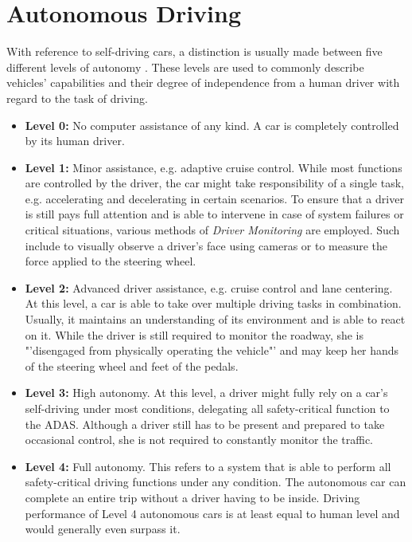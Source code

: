 \section{Autonomous Driving}
\label{sec:background:autonomous_driving}
With reference to self-driving cars, a distinction is usually made between five different levels of autonomy \cite{Klein}. These levels are used to commonly describe vehicles' capabilities and their degree of independence from a human driver with regard to the task of driving. 

\begin{itemize}
	\item \textbf{Level 0:} No computer assistance of any kind. A car is completely controlled by its human driver.
	\item \textbf{Level 1:} Minor assistance, e.g. adaptive cruise control. While most functions are controlled by the driver, the car might take responsibility of a single task, e.g. accelerating and decelerating in certain scenarios. To ensure that a driver is still pays full attention and is able to intervene in case of system failures or critical situations, various methods of \textit{Driver Monitoring} are employed. Such include to visually observe a driver's face using cameras or to measure the force applied to the steering wheel.
	\item \textbf{Level 2:} Advanced driver assistance, e.g. cruise control and lane centering. At this level, a car is able to take over multiple driving tasks in combination. Usually, it maintains an understanding of its environment and is able to react on it. While the driver is still required to monitor the roadway, she is "'disengaged from physically operating the vehicle"' \cite{Klein} and may keep her hands of the steering wheel and feet of the pedals. 
	\item \textbf{Level 3:} High autonomy. At this level, a driver might fully rely on a car's self-driving under most conditions, delegating all safety-critical function to the ADAS. Although a driver still has to be present and prepared to take occasional control, she is not required to constantly monitor the traffic. 
	\item \textbf{Level 4:} Full autonomy. This refers to a system that is able to perform all safety-critical driving functions under any condition. The autonomous car can complete an entire trip without a driver having to be inside. Driving performance of Level 4 autonomous cars is at least equal to human level and would generally even surpass it. 
\end{itemize}

